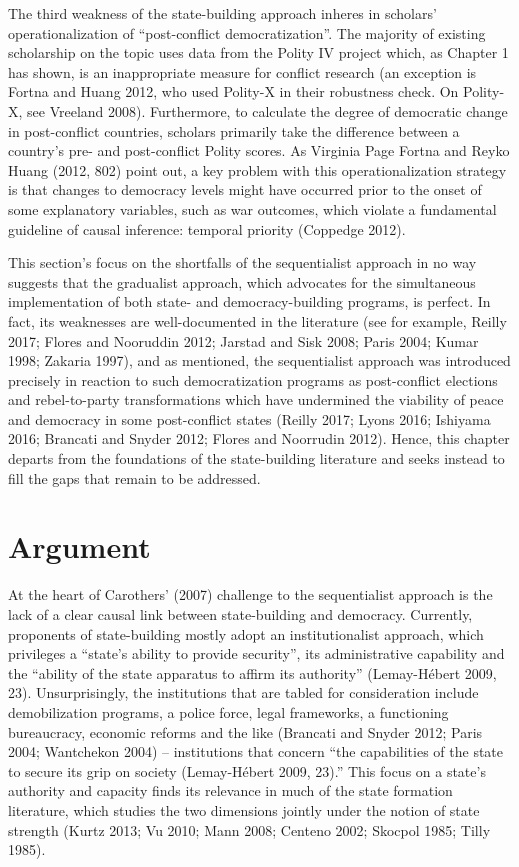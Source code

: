 \documentclass [11pt]{article}
\begin{document}
The third weakness of the state-building approach inheres in scholars' operationalization of ``post-conflict democratization''. The majority of existing scholarship on the topic uses data from the Polity IV project which, as Chapter 1 has shown, is an inappropriate measure for conflict research (an exception is Fortna and Huang 2012, who used Polity-X in their robustness check. On Polity-X, see Vreeland 2008). Furthermore, to calculate the degree of democratic change in post-conflict countries, scholars primarily take the difference between a country's pre- and post-conflict Polity scores. As Virginia Page Fortna and Reyko Huang (2012, 802) point out, a key problem with this operationalization strategy is that changes to democracy levels might have occurred prior to the onset of some explanatory variables, such as war outcomes, which violate a fundamental guideline of causal inference: temporal priority (Coppedge 2012).

This section's focus on the shortfalls of the sequentialist approach in no way suggests that the gradualist approach, which advocates for the simultaneous implementation of both state- and democracy-building programs, is perfect. In fact, its weaknesses are well-documented in the literature (see for example, Reilly 2017; Flores and Nooruddin 2012; Jarstad and Sisk 2008; Paris 2004; Kumar 1998; Zakaria 1997), and as mentioned, the sequentialist approach was introduced precisely in reaction to such democratization programs as post-conflict elections and rebel-to-party transformations which have undermined the viability of peace and democracy in some post-conflict states (Reilly 2017; Lyons 2016; Ishiyama 2016; Brancati and Snyder 2012; Flores and Noorrudin 2012). Hence, this chapter departs from the foundations of the state-building literature and seeks instead to fill the gaps that remain to be addressed.

\section*{Argument}

At the heart of Carothers' (2007) challenge to the sequentialist approach is the lack of a clear causal link between state-building and democracy. Currently, proponents of state-building mostly adopt an institutionalist approach, which privileges a ``state's ability to provide security'', its administrative capability and the ``ability of the state apparatus to affirm its authority'' (Lemay-Hébert 2009, 23). Unsurprisingly, the institutions that are tabled for consideration include demobilization programs, a police force, legal frameworks, a functioning bureaucracy, economic reforms and the like (Brancati and Snyder 2012; Paris 2004; Wantchekon 2004) -- institutions that concern ``the capabilities of the state to secure its grip on society (Lemay-Hébert 2009, 23).'' This focus on a state's authority and capacity finds its relevance in much of the state formation literature, which studies the two dimensions jointly under the notion of state strength (Kurtz 2013; Vu 2010; Mann 2008; Centeno 2002; Skocpol 1985; Tilly 1985).
\end{document}
